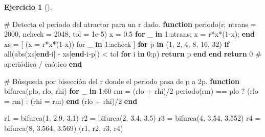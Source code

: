 \documentclass[
  spanish,
  a4paper,
]{scrreport}
\newenvironment{Shaded}{\begin{snugshade}}{\end{snugshade}}
\newcommand{\CommentTok}[1]{\textcolor[rgb]{0.37,0.37,0.37}{#1}}
\newcommand{\ControlFlowTok}[1]{\textcolor[rgb]{0.00,0.23,0.31}{\textbf{#1}}}
\newcommand{\FloatTok}[1]{\textcolor[rgb]{0.68,0.00,0.00}{#1}}
\newcommand{\FunctionTok}[1]{\textcolor[rgb]{0.28,0.35,0.67}{#1}}
\newcommand{\KeywordTok}[1]{\textcolor[rgb]{0.00,0.23,0.31}{\textbf{#1}}}
\newcommand{\NormalTok}[1]{\textcolor[rgb]{0.00,0.23,0.31}{#1}}
\newcommand{\OperatorTok}[1]{\textcolor[rgb]{0.37,0.37,0.37}{#1}}
\theoremstyle{definition}
\newtheorem{exercise}{Ejercicio}[chapter]
\theoremstyle{remark}
\begin{document}
\begin{exercise}[]
\begin{tcolorbox}
\begin{Shaded}
\begin{Highlighting}[]
\CommentTok{\# Detecta el periodo del atractor para un r dado.}
\KeywordTok{function} \FunctionTok{periodo}\NormalTok{(r; ntrans }\OperatorTok{=} \FloatTok{2000}\NormalTok{, ncheck }\OperatorTok{=} \FloatTok{2048}\NormalTok{, tol }\OperatorTok{=} \FloatTok{1e{-}5}\NormalTok{)}
\NormalTok{    x }\OperatorTok{=} \FloatTok{0.5}
    \ControlFlowTok{for}\NormalTok{ \_ }\KeywordTok{in} \FloatTok{1}\OperatorTok{:}\NormalTok{ntrans; x }\OperatorTok{=} \FunctionTok{r*x*}\NormalTok{(}\FloatTok{1}\OperatorTok{{-}}\NormalTok{x); }\ControlFlowTok{end}
\NormalTok{    xs }\OperatorTok{=}\NormalTok{ [ (x }\OperatorTok{=} \FunctionTok{r*x*}\NormalTok{(}\FloatTok{1}\OperatorTok{{-}}\NormalTok{x)) for \_ }\KeywordTok{in} \FloatTok{1}\OperatorTok{:}\NormalTok{ncheck ]}
    \ControlFlowTok{for}\NormalTok{ p }\KeywordTok{in}\NormalTok{ (}\FloatTok{1}\NormalTok{, }\FloatTok{2}\NormalTok{, }\FloatTok{4}\NormalTok{, }\FloatTok{8}\NormalTok{, }\FloatTok{16}\NormalTok{, }\FloatTok{32}\NormalTok{)}
        \ControlFlowTok{if} \FunctionTok{all}\NormalTok{(}\FunctionTok{abs}\NormalTok{(xs[}\KeywordTok{end}\OperatorTok{{-}}\NormalTok{i] }\OperatorTok{{-}}\NormalTok{ xs[}\KeywordTok{end}\OperatorTok{{-}}\NormalTok{i}\OperatorTok{{-}}\NormalTok{p]) }\OperatorTok{\textless{}}\NormalTok{ tol }\ControlFlowTok{for}\NormalTok{ i }\KeywordTok{in} \FloatTok{0}\OperatorTok{:}\NormalTok{p)}
            \ControlFlowTok{return}\NormalTok{ p}
        \ControlFlowTok{end}
    \ControlFlowTok{end}
    \ControlFlowTok{return} \FloatTok{0}   \CommentTok{\# aperiódico / caótico}
\ControlFlowTok{end}

\CommentTok{\# Búsqueda por bisección del r donde el periodo pasa de p a 2p.}
\KeywordTok{function} \FunctionTok{bifurca}\NormalTok{(plo, rlo, rhi)}
    \ControlFlowTok{for}\NormalTok{ \_ }\KeywordTok{in} \FloatTok{1}\OperatorTok{:}\FloatTok{60}
\NormalTok{        rm }\OperatorTok{=}\NormalTok{ (rlo }\OperatorTok{+}\NormalTok{ rhi)}\OperatorTok{/}\FloatTok{2}
        \FunctionTok{periodo}\NormalTok{(rm) }\OperatorTok{==}\NormalTok{ plo ? (rlo }\OperatorTok{=}\NormalTok{ rm) }\OperatorTok{:}\NormalTok{ (rhi }\OperatorTok{=}\NormalTok{ rm)}
    \ControlFlowTok{end}
\NormalTok{    (rlo }\OperatorTok{+}\NormalTok{ rhi)}\OperatorTok{/}\FloatTok{2}
\KeywordTok{end}

\NormalTok{r1 }\OperatorTok{=} \FunctionTok{bifurca}\NormalTok{(}\FloatTok{1}\NormalTok{, }\FloatTok{2.9}\NormalTok{, }\FloatTok{3.1}\NormalTok{)}
\NormalTok{r2 }\OperatorTok{=} \FunctionTok{bifurca}\NormalTok{(}\FloatTok{2}\NormalTok{, }\FloatTok{3.4}\NormalTok{, }\FloatTok{3.5}\NormalTok{)}
\NormalTok{r3 }\OperatorTok{=} \FunctionTok{bifurca}\NormalTok{(}\FloatTok{4}\NormalTok{, }\FloatTok{3.54}\NormalTok{, }\FloatTok{3.552}\NormalTok{)}
\NormalTok{r4 }\OperatorTok{=} \FunctionTok{bifurca}\NormalTok{(}\FloatTok{8}\NormalTok{, }\FloatTok{3.564}\NormalTok{, }\FloatTok{3.569}\NormalTok{)}
\NormalTok{(r1, r2, r3, r4)}
\end{Highlighting}
\end{Shaded}


\end{tcolorbox}
\end{exercise}
\end{document}
